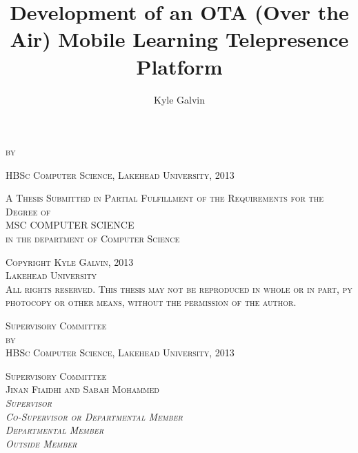 \documentclass[final,a4paper,12pt]{report}
\begin{document}
\begin{titlepage}
	\begin{center}
	\title{\Large Development of an OTA (Over the Air) Mobile Learning Telepresence Platform}
	\thetitle{\\}
	\textsc{\normalsize by\\}
	\author{\normalsize Kyle Galvin}
	\theauthor{\\}
	\normalsize\textsc{HBSc Computer Science, Lakehead University, 2013\\[0.5cm]}
	
	\textsc{A Thesis Submitted in Partial Fulfillment of the Requirements for the Degree of\\[0.5cm]}
	\textsc{MSC COMPUTER SCIENCE\\}
	\textsc{in the department of Computer Science\\[11.5cm]}




	\textsc{Copyright Kyle Galvin, 2013\\}
	\textsc{Lakehead University\\[0.5cm]}
	\textsc{All rights reserved. This thesis may not be reproduced in whole or in part, py photocopy or other means, without the permission of the author.}
	\end{center}
\end{titlepage}
\newpage
	\begin{center}
		\textsc{\LARGE Supervisory Committee\\[2cm]}
		\thetitle{\\}
		\textsc{\normalsize by\\}
		\theauthor{\\}
		\normalsize\textsc{HBSc Computer Science, Lakehead University, 2013\\[10cm]}
	\end{center}
	\textsc{\Large Supervisory Committee\\[0.5cm]}
	\textsc{Jinan Fiaidhi and Sabah Mohammed\\}
	\textsc{\emph{Supervisor}\\}
	\textsc{\emph{Co-Supervisor or Departmental Member}\\}
	\textsc{\emph{Departmental Member}\\}
	\textsc{\emph{Outside Member}\\}
\newpage

\tableofcontents
\end{document}
